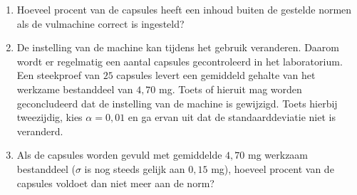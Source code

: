 \begin{enumerate}[label=(\alph*)]
    \item Hoeveel procent van de capsules heeft een inhoud buiten de gestelde normen als de vulmachine correct is ingesteld?
    \answer{
    
    }

    \item De instelling van de machine kan tijdens het gebruik veranderen.
    Daarom wordt er regelmatig een aantal capsules gecontroleerd in het laboratorium.
    Een steekproef van $25$ capsules levert een gemiddeld gehalte van het werkzame bestanddeel van $4,70$ mg.
    Toets of hieruit mag worden geconcludeerd dat de instelling van de machine is gewijzigd.
    Toets hierbij tweezijdig, kies $\alpha=0,01$ en ga ervan uit dat de standaarddeviatie niet is veranderd.
    \answer{
        
    }

    \item Als de capsules worden gevuld met gemiddelde $4,70$ mg werkzaam bestanddeel ($\sigma$ is nog steeds gelijk aan $0,15$ mg), hoeveel procent van de capsules voldoet dan niet meer aan de norm?
    \answer{
        
    }
\end{enumerate}
